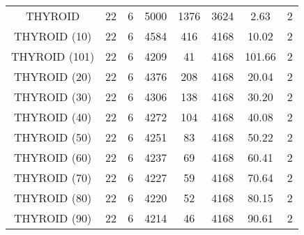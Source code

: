 \begin{longtable}{cccccccc}
           THYROID &      22 &           6 &  5000 &       1376 &       3624 &   2.63 &        2 \\
      THYROID (10) &      22 &           6 &  4584 &        416 &       4168 &  10.02 &        2 \\
     THYROID (101) &      22 &           6 &  4209 &         41 &       4168 & 101.66 &        2 \\
      THYROID (20) &      22 &           6 &  4376 &        208 &       4168 &  20.04 &        2 \\
      THYROID (30) &      22 &           6 &  4306 &        138 &       4168 &  30.20 &        2 \\
      THYROID (40) &      22 &           6 &  4272 &        104 &       4168 &  40.08 &        2 \\
      THYROID (50) &      22 &           6 &  4251 &         83 &       4168 &  50.22 &        2 \\
      THYROID (60) &      22 &           6 &  4237 &         69 &       4168 &  60.41 &        2 \\
      THYROID (70) &      22 &           6 &  4227 &         59 &       4168 &  70.64 &        2 \\
      THYROID (80) &      22 &           6 &  4220 &         52 &       4168 &  80.15 &        2 \\
      THYROID (90) &      22 &           6 &  4214 &         46 &       4168 &  90.61 &        2 \\
\end{longtable}
